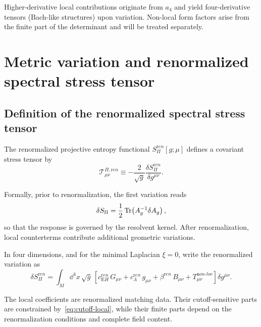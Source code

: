 \documentclass[pdflatex,sn-mathphys-num]{sn-jnl} %
\theoremstyle{remark}
\theoremstyle{plain}
\begin{document}
    Higher-derivative local contributions originate from $a_4$ and yield
    four-derivative tensors (Bach-like structures) upon variation.
    Non-local form factors arise from the finite part of the determinant
    and will be treated separately.

  \section{Metric variation and renormalized spectral stress tensor}
  \label{sec:metric-variation}

  \subsection{Definition of the renormalized spectral stress tensor}
    \label{subsec:spectral-stress}

    The renormalized projective entropy functional
    $S_\Pi^{\mathrm ren}[g;\mu]$ defines a covariant stress tensor by
    \begin{equation}
      \mathcal{T}^{\Pi,{\mathrm ren}}_{\mu\nu}
      \equiv
      -\frac{2}{\sqrt{g}}
      \frac{\delta S_\Pi^{\mathrm ren}}{\delta g^{\mu\nu}} .
    \end{equation}

    Formally, prior to renormalization, the first variation reads
    \begin{equation}
      \delta S_\Pi
      =
      \frac12 \Tr\!\left(A_g^{-1}\delta A_g\right),
    \end{equation}
    so that the response is governed by the resolvent kernel.
    After renormalization, local counterterms contribute additional
    geometric variations.

    In four dimensions, and for the minimal Laplacian $\xi=0$, write the renormalized variation as
    \begin{equation}
      \delta S_\Pi^{\mathrm ren}
      =
      \int_M\dd^4x\,\sqrt{g}\,
      \left[
        c_{\mathrm EH}^{\mathrm ren}\,G_{\mu\nu}
        +c_\Lambda^{\mathrm ren}\,g_{\mu\nu}
        +\beta^{\mathrm ren}\,B_{\mu\nu}
        +T^{\mathrm non\mbox{-}loc}_{\mu\nu}
      \right]\delta g^{\mu\nu}.
      \label{eq:full-decomposition}
    \end{equation}

    The local coefficients are renormalized matching data.
    Their cutoff-sensitive parts are constrained by~\eqref{eq:cutoff-local}, while their finite parts depend on the
    renormalization conditions and complete field content.
\end{document}
